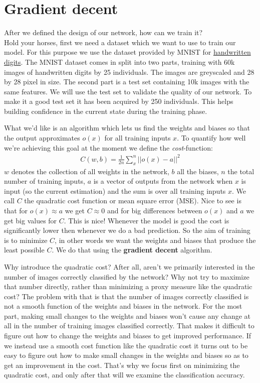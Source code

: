 \documentclass[10pt]{book}
\begin{document}
    \section{Gradient decent}
    After we defined the design of our network, how can we train it?\\
    Hold your horses, first we need a dataset which we want to use to train our model. For this purpose we use
    the dataset provided by MNIST for \href{http://yann.lecun.com/exdb/mnist/}{handwritten digits}.
    The MNIST dataset comes in split into two parts, training with 60k images of handwritten digits by 25 individuals. The images are greyscaled and 28 by 28 pixel in size.
    The second part is a test set containing 10k images with the same features.
    We will use the test set to validate the quality of our network. To make it a good test set it has been acquired by
    250 individuals. This helps building confidence in the current state during the training phase.
    
    What we'd like is an algorithm which lets us find the weights and biases so that the output approximates \(o(x)\) for all training inputs \(x\). To quantify how well
    we're achieving this goal at the moment we define the \textit{cost}-function:
    \begin{align}
        C(w,b) = \frac{1}{2n}\sum \limits_x^n || o(x) - a ||^2
        \label{eq:cost}
    \end{align}
    \(w\) denotes the collection of all weights in the network, \(b\) all the biases, \(n\) the total number of training inputs, \(a\) is a vector of outputs from the network when \(x\) is input (so the current estimation)
    and the sum is over all training inputs \(x\). We call \(C\) the quadratic cost function or mean square error (MSE). Nice to see is that for \(o(x) \approx a\) we get \(C\approx 0\) and for big differences between \(o(x)\) and \(a\)
    we get big values for \(C\). This is nice! Whenever the model is good the cost is significantly lower then whenever we do a bad prediction.
    So the aim of training is to minimize \(C\), in other words we want the weights and biases that produce the least possible \(C\).
    We do that using the \textbf{gradient decent} algorithm.

    Why introduce the quadratic cost? After all, aren't we primarily interested in the number of images correctly classified by the network? Why not try to maximize that number directly, rather than minimizing a proxy measure like the quadratic cost? The problem with that is that the number of images correctly classified is not a smooth function of the weights and biases in the network. For the most part, making small changes to the weights and biases won't cause any change at all in the number of training images classified correctly. That makes it difficult to figure out how to change the weights and biases to get improved performance. If we instead use a smooth cost function like the quadratic cost it turns out to be easy to figure out how to make small changes in the weights and biases so as to get an improvement in the cost. That's why we focus first on minimizing the quadratic cost, and only after that will we examine the classification accuracy.
\end{document}
